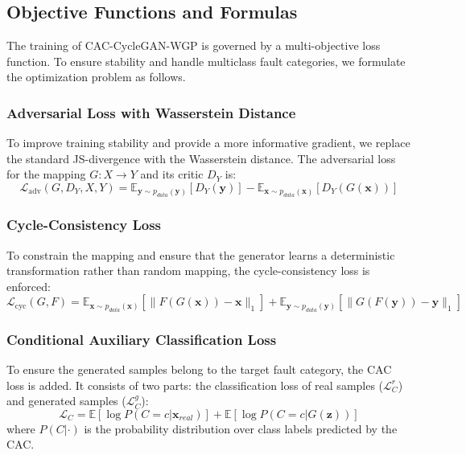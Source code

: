 \subsection{Objective Functions and Formulas}
The training of CAC-CycleGAN-WGP is governed by a multi-objective loss function. To ensure stability and handle multiclass fault categories, we formulate the optimization problem as follows.

\subsubsection{Adversarial Loss with Wasserstein Distance}
To improve training stability and provide a more informative gradient, we replace the standard JS-divergence with the Wasserstein distance. The adversarial loss for the mapping $G: X \to Y$ and its critic $D_Y$ is:
\begin{equation}
\mathcal{L}_{\text{adv}}(G, D_Y, X, Y) = \mathbb{E}_{\boldsymbol{y} \sim p_{data}(\boldsymbol{y})}[D_Y(\boldsymbol{y})] - \mathbb{E}_{\boldsymbol{x} \sim p_{data}(\boldsymbol{x})}[D_Y(G(\boldsymbol{x}))]
\end{equation}

\subsubsection{Cycle-Consistency Loss}
To constrain the mapping and ensure that the generator learns a deterministic transformation rather than random mapping, the cycle-consistency loss is enforced:
\begin{equation}
\mathcal{L}_{\text{cyc}}(G, F) = \mathbb{E}_{\boldsymbol{x} \sim p_{data}(\boldsymbol{x})} [\|F(G(\boldsymbol{x})) - \boldsymbol{x}\|_1] + \mathbb{E}_{\boldsymbol{y} \sim p_{data}(\boldsymbol{y})} [\|G(F(\boldsymbol{y})) - \boldsymbol{y}\|_1]
\end{equation}

\subsubsection{Conditional Auxiliary Classification Loss}
To ensure the generated samples belong to the target fault category, the CAC loss is added. It consists of two parts: the classification loss of real samples ($\mathcal{L}_{C}^{r}$) and generated samples ($\mathcal{L}_{C}^{g}$):
\begin{equation}
\mathcal{L}_{C} = \mathbb{E}[\log P(C=c | \boldsymbol{x}_{real})] + \mathbb{E}[\log P(C=c | G(\boldsymbol{z}))]
\end{equation}
where $P(C| \cdot)$ is the probability distribution over class labels predicted by the CAC.


